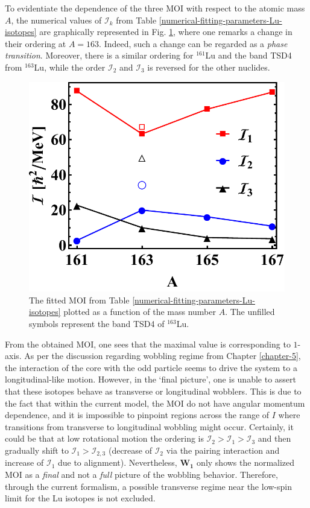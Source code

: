 To evidentiate the dependence of the three MOI with respect to the atomic mass $A$, the numerical values of $\mathcal{I}_k$ from Table \ref{numerical-fitting-parameters-Lu-isotopes} are graphically represented in Fig. \ref{MOIs-A-behavior-Lu-isotopes}, where one remarks a change in their ordering at $A=163$. Indeed, such a change can be regarded as a \emph{phase transition}. Moreover, there is a similar ordering for $^{161}$Lu and the band TSD4 from $^{163}$Lu, while the order $\mathcal{I}_2$ and $\mathcal{I}_3$ is reversed for the other nuclides.
\begin{figure}
    \centering
    \includegraphics[scale=0.65]{Chapters/Figures/fig1_moivalues.pdf}
    \caption{The fitted MOI from Table \ref{numerical-fitting-parameters-Lu-isotopes} plotted as a function of the mass number $A$. The unfilled symbols represent the band TSD4 of $^{163}$Lu.}
    \label{MOIs-A-behavior-Lu-isotopes}
\end{figure}

From the obtained MOI, one sees that the maximal value is corresponding to $1$-axis. As per the discussion regarding wobbling regime from Chapter \ref{chapter-5}, the interaction of the core with the odd particle seems to drive the system to a longitudinal-like motion. However, in the `final picture', one is unable to assert that these isotopes behave as transverse or longitudinal wobblers. This is due to the fact that within the current model, the MOI do not have angular momentum dependence, and it is impossible to pinpoint regions across the range of $I$ where transitions from transverse to longitudinal wobbling might occur. Certainly, it could be that at low rotational motion the ordering is $\mathcal{I}_2>\mathcal{I}_1>\mathcal{I}_3$ and then gradually shift to $\mathcal{I}_1>\mathcal{I}_{2,3}$ (decrease of $\mathcal{I}_2$ via the pairing interaction and increase of $\mathcal{I}_1$ due to alignment). Nevertheless, $\mathbf{W_1}$ only shows the normalized MOI as a \emph{final} and not a \emph{full} picture of the wobbling behavior. Therefore, through the current formalism, a possible transverse regime near the low-spin limit for the Lu isotopes is not excluded.

